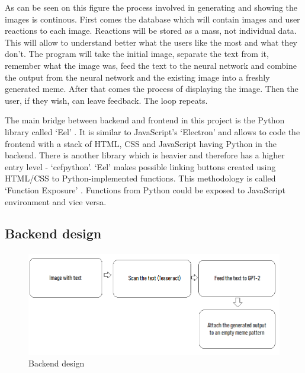 \documentclass[12pt]{report}
\begin{document}
    As can be seen on this figure the process involved in generating and showing the images is continous. First comes the database which will contain images and user reactions to each image. Reactions will be stored as a mass, not individual data. This will allow to understand better what the users like the most and what they don't. 
    The program will take the initial image, separate the text from it, remember what the image was, feed the text to the neural network and combine the output from the neural network and the existing image into a freshly generated meme. After that comes the process of displaying the image. Then the user, if they wish, can leave feedback. The loop repeats.

    The main bridge between backend and frontend in this project is the Python library called `Eel' \citep{eel_github}. It is similar to JavaScript's `Electron' and allows to code the frontend with a stack of HTML, CSS and JavaScript having Python in the backend. There is another library which is heavier and therefore has a higher entry level - `cefpython'.
    `Eel' makes possible linking buttons created using HTML/CSS to Python-implemented functions. This methodology is called `Function Exposure' \citep{eel_github}. Functions from Python could be exposed to JavaScript environment and vice versa.

    \subsection*{Backend design}
    \paragraph{}

    \begin{figure}[h]
        \centerline{\includegraphics[scale=.5]{img/backend_diagram.png}}
        \label{backend_diagram}
        \caption{Backend design}
    \end{figure}
\end{document}
